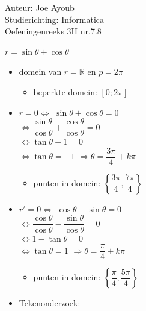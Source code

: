 \documentclass[a4paper]{article}
\newcommand{\0}{\theta}
\begin{document}
  
\noindent \large Auteur: Joe Ayoub \\
\noindent \large Studierichting: Informatica\\
\noindent \large Oefeningenreeks 3H nr.7.8 \\

\medskip

\normalsize

$r = \sin\0 + \cos\0$ \\

\begin{itemize}
	\item domein van $r = \mathbb{R}$ en $p = 2\pi$
	\begin{itemize}
		\item beperkte domein: $[0;2\pi]$
	\end{itemize}
	\item $r = 0 \Leftrightarrow$
	$\sin\0 + \cos\0 = 0$ \\
	
	$\Leftrightarrow \dfrac{\sin\0}{\cos\0} + \dfrac{\cos\0}{\cos\0} = 0$ \\
	
	$\Leftrightarrow \tan\0 + 1 = 0$ \\
	
	$\Leftrightarrow \tan\0 = -1$
	$\Rightarrow \0 = \dfrac{3\pi}{4} + k\pi$ \\
	
	\begin{itemize}
	\item punten in domein: $\left\{\dfrac{3\pi}{4},\dfrac{7\pi}{4}\right\}$
	\end{itemize}
	
	
	\item $r' = 0 \Leftrightarrow$
	$\cos\0 - \sin\0 = 0$ \\
	
	$\Leftrightarrow \dfrac{\cos\0}{\cos\0} - \dfrac{\sin\0}{\cos\0} = 0$ \\
	
	$\Leftrightarrow 1 - \tan\0 = 0$ \\
	
	$\Leftrightarrow \tan\0 = 1$
	$\Rightarrow \0 = \dfrac{\pi}{4} + k\pi$ \\
	\begin{itemize}
	\item punten in domein: $\left\{\dfrac{\pi}{4},\dfrac{5\pi}{4}\right\}$
	\end{itemize}
	
	\item Tekenonderzoek: \\
	

\end{itemize}
\end{document}
